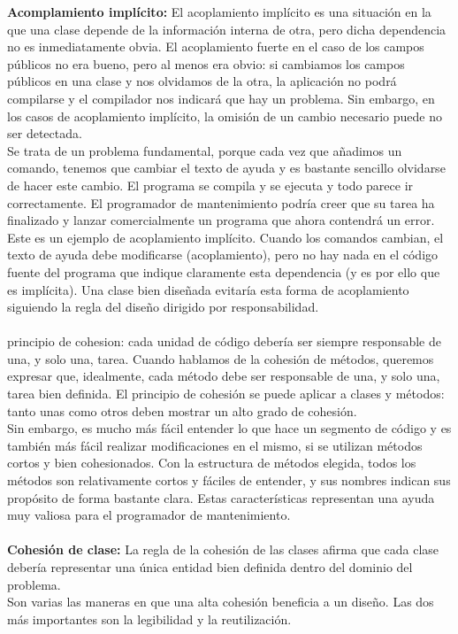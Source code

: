 \documentclass[11pt,a4paper]{article}
\begin{document}
\textbf{Acomplamiento implícito:} El acoplamiento implícito es una situación en la que una clase depende de la información interna de
otra, pero dicha dependencia no es inmediatamente obvia. El acoplamiento fuerte en el caso de los
campos públicos no era bueno, pero al menos era obvio: si cambiamos los campos públicos en una
clase y nos olvidamos de la otra, la aplicación no podrá compilarse y el compilador nos indicará
que hay un problema. Sin embargo, en los casos de acoplamiento implícito, la omisión de un cambio
necesario puede no ser detectada.\\
Se trata de un problema fundamental, porque cada vez que añadimos un comando, tenemos que
cambiar el texto de ayuda y es bastante sencillo olvidarse de hacer este cambio. El programa se
compila y se ejecuta y todo parece ir correctamente. El programador de mantenimiento podría
creer que su tarea ha finalizado y lanzar comercialmente un programa que ahora contendrá un
error.
Este es un ejemplo de acoplamiento implícito. Cuando los comandos cambian, el texto de ayuda
debe modificarse (acoplamiento), pero no hay nada en el código fuente del programa que indique
claramente esta dependencia (y es por ello que es implícita).
Una clase bien diseñada evitaría esta forma de acoplamiento siguiendo la regla del diseño dirigido
por responsabilidad. \\
\\principio de cohesion: cada unidad de código debería ser
siempre responsable de una, y solo una, tarea. Cuando hablamos de la cohesión de métodos, queremos expresar que, idealmente, cada método
debe ser responsable de una, y solo una, tarea bien definida. El principio de cohesión se puede aplicar a clases y métodos: tanto unas como otros deben mostrar
un alto grado de cohesión. \\
Sin embargo, es mucho más fácil entender lo que hace un segmento de código y es también más
fácil realizar modificaciones en el mismo, si se utilizan métodos cortos y bien cohesionados. Con
la estructura de métodos elegida, todos los métodos son relativamente cortos y fáciles de entender,
y sus nombres indican sus propósito de forma bastante clara. Estas características representan una
ayuda muy valiosa para el programador de mantenimiento.\\
\\
\textbf{Cohesión de clase:} La regla de la cohesión de las clases afirma que cada clase debería representar una única entidad
bien definida dentro del dominio del problema.\\
Son varias las maneras en que una alta cohesión beneficia a un diseño. Las dos más importantes
son la legibilidad y la reutilización.
\end{document}
